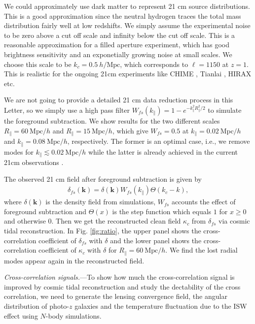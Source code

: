 \documentclass[aps,prl,twocolumn,showpacs,superscriptaddress,groupedaddress,nofootinbib,floatfix]{revtex4}  %
\newcommand{\mr}{\mathrm}
\begin{document}
We could approximately use dark matter to represent 21 cm source distributions.
This is a good approximation since the neutral hydrogen traces the total mass
distribution fairly well at low redshifts. We simply assume the experimental
noise to be zero above a cut off scale and infinity below the cut off scale.
This is a reasonable approximation for a filled aperture experiment, which
has good brightness sensitivity and an exponetially growing noise at small 
scales.
We choose this scale to be $k_c=0.5\ h/\mr{Mpc}$, which corresponds
to $\ell=1150$ at $z=1$. This is realistic for the ongoing 21cm experiments like
CHIME \cite{2014SPIE.9145E..22B}, Tianlai \cite{2015ApJ...798...40X}, 
HIRAX \cite{HIRAX} etc.

We are not going to provide a detailed 21 cm data reduction process in this 
Letter, so we simply  use a high pass filter 
$W_{fs}(k_\parallel)=1-e^{-k_\parallel^2R_\parallel^2/2}$ to simulate the 
foreground subtraction. We show results for the two different scales 
$R_\parallel=60\ \mr{Mpc}/h$ and $R_\parallel=15\ \mr{Mpc}/h$, which give
$W_{fs}=0.5$ at $k_\parallel=0.02\ \mr{Mpc}/h$ and 
$k_\parallel=0.08\ \mr{Mpc}/h$, respectively. The former is an optimal case, 
i.e., we remove modes for $k_\parallel\lesssim0.02\ \mr{Mpc}/h$ while the latter
is already achieved in the current 21cm observations 
\cite{2013ApJ...763L..20M,2013MNRAS.434L..46S}.

The observed 21 cm field after foreground subtraction is given by 
\begin{eqnarray}
\delta_{fs}(\bm{k})=\delta(\bm{k})W_{fs}(k_\parallel)\Theta(k_c-k),
\end{eqnarray}
where $\delta(\bm{k})$ is the density field from simulations, $W_{fs}$ accounts
the effect of foreground subtraction and $\Theta(x)$ is the step function 
which equals $1$ for $x\ge0$ and otherwise $0$.
Then we get the reconstructed clean field $\kappa_c$ from $\delta_{fs}$ via
cosmic tidal reconstruction. In Fig. \ref{fig:ratio}, the upper panel shows the 
cross-correlation coefficient of $\delta_{fs}$ with $\delta$ and the lower 
panel shows the cross-correlation coefficient of $\kappa_c$ with $\delta$ for 
$R_\parallel=60\ \mr{Mpc}/h$. 
We find the lost radial modes appear again in the reconstructed field.

{\it Cross-correlation signals.}---To show how much the cross-correlation signal
is improved by cosmic tidal reconstruction and study the dectability of the
cross correlation, we need to generate the lensing convergence field,
the angular distribution of photo-$z$ galaxies and the temperature fluctuation
due to the ISW effect using $N$-body simulations.
\end{document}
